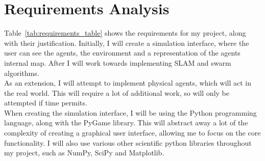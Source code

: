 \documentclass[12pt]{article}
\begin{document}
\section{Requirements Analysis}
Table~\ref{tab:requirements_table} shows the requirements for my project, along with their justification. Initially, I will
create a simulation interface, where the user can see the agents, the environment and a representation of the agents internal
map. After I will work towards implementing SLAM and swarm algorithms.\\
As an extension, I will attempt to implement physical agents, which will act in the real world. This will require a lot of
additional work, so will only be attempted if time permits.\\
When creating the simulation interface, I will be using the Python programming language, along with the PyGame library. This
will abstract away a lot of the complexity of creating a graphical user interface, allowing me to focus on the core functionality.
I will also use various other scientific python libraries throughout my project, such as NumPy, SciPy and Matplotlib.\\
\end{document}

